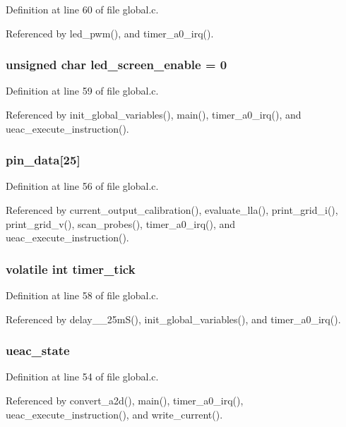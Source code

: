 Definition at line 60 of file global.c.

Referenced by led\_\-pwm(), and timer\_\-a0\_\-irq().
\subsubsection{\setlength{\rightskip}{0pt plus 5cm}unsigned char {\bf led\_\-screen\_\-enable} = 0}\label{global_8c_a6}




Definition at line 59 of file global.c.

Referenced by init\_\-global\_\-variables(), main(), timer\_\-a0\_\-irq(), and ueac\_\-execute\_\-instruction().
\subsubsection{ {\bf pin\_\-data}[25]}\label{global_8c_a3}




Definition at line 56 of file global.c.

Referenced by current\_\-output\_\-calibration(), evaluate\_\-lla(), print\_\-grid\_\-i(), print\_\-grid\_\-v(), scan\_\-probes(), timer\_\-a0\_\-irq(), and ueac\_\-execute\_\-instruction().
\subsubsection{\setlength{\rightskip}{0pt plus 5cm}volatile int {\bf timer\_\-tick}}\label{global_8c_a5}




Definition at line 58 of file global.c.

Referenced by delay\_\_\-25m\-S(), init\_\-global\_\-variables(), and timer\_\-a0\_\-irq().
\subsubsection{ {\bf ueac\_\-state}}\label{global_8c_a1}




Definition at line 54 of file global.c.

Referenced by convert\_\-a2d(), main(), timer\_\-a0\_\-irq(), ueac\_\-execute\_\-instruction(), and write\_\-current().